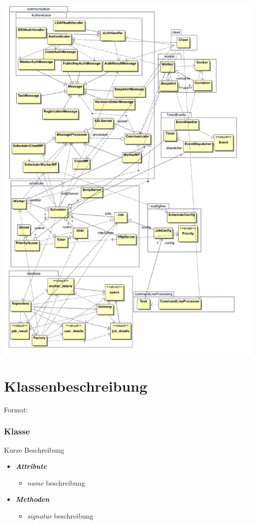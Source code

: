 \documentclass[a4paper,12pt]{article}
\begin{document}
\includegraphics[width=\textwidth]{miniclassoverview}


\clearpage
\section{Klassenbeschreibung}

\iffalse
Format:
\subsubsection{Klasse}

Kurze Beschreibung

\begin{itemize}[label={}]

	\item \textit{\textbf{Attribute}}
		\begin{itemize}[label={\textbullet}]
			\item \textit{name} beschreibung
		\end{itemize}

	\item \textit{\textbf{Methoden}}
		\begin{itemize}[label={\textbullet}]
			\item \textit{signatur} beschreibung
		\end{itemize}


\end{itemize}
\end{document}
